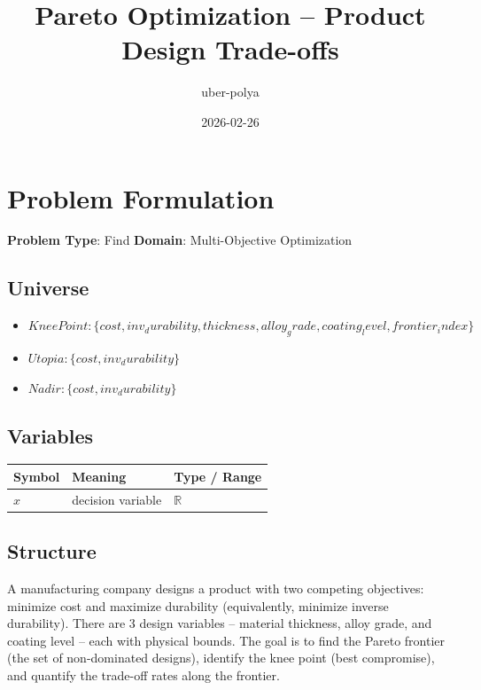 \documentclass[11pt, a4paper]{article}
\title{Pareto Optimization -- Product Design Trade-offs}
\author{uber-polya}
\date{2026-02-26}
\begin{document}
\maketitle
\tableofcontents
\newpage

\section{Problem Formulation}

\begin{polyamodel}

\textbf{Problem Type}: Find \hfill
\textbf{Domain}: Multi-Objective Optimization


\end{polyamodel}

\subsection{Universe}

\begin{itemize}
  \item $Knee Point: \{cost, inv_durability, thickness, alloy_grade, coating_level, frontier_index\}$
  \item $Utopia: \{cost, inv_durability\}$
  \item $Nadir: \{cost, inv_durability\}$
\end{itemize}

\subsection{Variables}

\begin{longtable}{lll}
\toprule
\textbf{Symbol} & \textbf{Meaning} & \textbf{Type / Range} \\
\midrule
\endhead
$x$ & decision variable & $\mathbb{{R}}$ \\
\bottomrule
\end{longtable}

\subsection{Structure}

A manufacturing company designs a product with two competing objectives: minimize cost and maximize durability (equivalently, minimize inverse durability). There are 3 design variables -- material thickness, alloy grade, and coating level -- each with physical bounds. The goal is to find the Pareto frontier (the set of non-dominated designs), identify the knee point (best compromise), and quantify the trade-off rates along the frontier.
\end{document}
